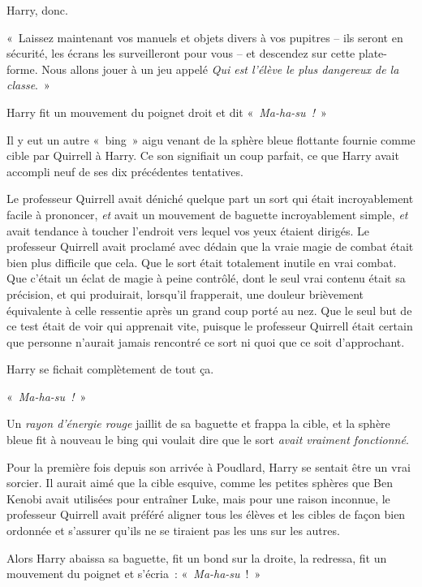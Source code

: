 Harry, donc.

«~Laissez maintenant vos manuels et objets divers à vos pupitres -- ils seront en sécurité, les écrans les surveilleront pour vous -- et descendez sur cette plate-forme. Nous allons jouer à un jeu appelé \emph{Qui est l'élève le plus dangereux de la classe}.~»

\later

Harry fit un mouvement du poignet droit et dit «~\emph{Ma-ha-su~!}~»

Il y eut un autre «~bing~» aigu venant de la sphère bleue flottante fournie comme cible par Quirrell à Harry. Ce son signifiait un coup parfait, ce que Harry avait accompli neuf de ses dix précédentes tentatives.

Le professeur Quirrell avait déniché quelque part un sort qui était incroyablement facile à prononcer, \emph{et} avait un mouvement de baguette incroyablement simple, \emph{et} avait tendance à toucher l'endroit vers lequel vos yeux étaient dirigés. Le professeur Quirrell avait proclamé avec dédain que la vraie magie de combat était bien plus difficile que cela. Que le sort était totalement inutile en vrai combat. Que c'était un éclat de magie à peine contrôlé, dont le seul vrai contenu était sa précision, et qui produirait, lorsqu'il frapperait, une douleur brièvement équivalente à celle ressentie après un grand coup porté au nez. Que le seul but de ce test était de voir qui apprenait vite, puisque le professeur Quirrell était certain que personne n'aurait jamais rencontré ce sort ni quoi que ce soit d'approchant.

Harry se fichait complètement de tout ça.

«~\emph{Ma-ha-su~!}~»

Un \emph{rayon d'énergie rouge} jaillit de sa baguette et frappa la cible, et la sphère bleue fit à nouveau le bing qui voulait dire que le sort \emph{avait vraiment fonctionné}.

Pour la première fois depuis son arrivée à Poudlard, Harry se sentait être un vrai sorcier. Il aurait aimé que la cible esquive, comme les petites sphères que Ben Kenobi avait utilisées pour entraîner Luke, mais pour une raison inconnue, le professeur Quirrell avait préféré aligner tous les élèves et les cibles de façon bien ordonnée et s'assurer qu'ils ne se tiraient pas les uns sur les autres.

Alors Harry abaissa sa baguette, fit un bond sur la droite, la redressa, fit un mouvement du poignet et s'écria~: «~\emph{Ma-ha-su}~!~»

